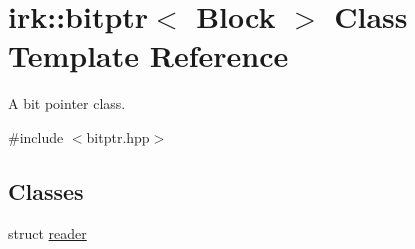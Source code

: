 \hypertarget{classirk_1_1bitptr}{}\section{irk\+:\+:bitptr$<$ Block $>$ Class Template Reference}
\label{classirk_1_1bitptr}


A bit pointer class.  




{\ttfamily \#include $<$bitptr.\+hpp$>$}

\subsection*{Classes}
\begin{DoxyCompactItemize}
\item 
struct \mbox{\hyperlink{structirk_1_1bitptr_1_1reader}{reader}}
\end{DoxyCompactItemize}
